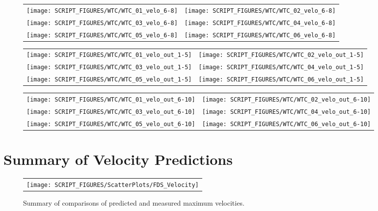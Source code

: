 \begin{figure}[p]
\begin{tabular*}{\textwidth}{l@{\extracolsep{\fill}}r}
\texttt{[image: SCRIPT\_FIGURES/WTC/WTC\_01\_velo\_6-8]} &
\texttt{[image: SCRIPT\_FIGURES/WTC/WTC\_02\_velo\_6-8]} \\
\texttt{[image: SCRIPT\_FIGURES/WTC/WTC\_03\_velo\_6-8]} &
\texttt{[image: SCRIPT\_FIGURES/WTC/WTC\_04\_velo\_6-8]} \\
\texttt{[image: SCRIPT\_FIGURES/WTC/WTC\_05\_velo\_6-8]} &
\texttt{[image: SCRIPT\_FIGURES/WTC/WTC\_06\_velo\_6-8]}
\end{tabular*}
\label{WTC_velo_6-8}
\end{figure}

\begin{figure}[p]
\begin{tabular*}{\textwidth}{l@{\extracolsep{\fill}}r}
\texttt{[image: SCRIPT\_FIGURES/WTC/WTC\_01\_velo\_out\_1-5]} &
\texttt{[image: SCRIPT\_FIGURES/WTC/WTC\_02\_velo\_out\_1-5]} \\
\texttt{[image: SCRIPT\_FIGURES/WTC/WTC\_03\_velo\_out\_1-5]} &
\texttt{[image: SCRIPT\_FIGURES/WTC/WTC\_04\_velo\_out\_1-5]} \\
\texttt{[image: SCRIPT\_FIGURES/WTC/WTC\_05\_velo\_out\_1-5]} &
\texttt{[image: SCRIPT\_FIGURES/WTC/WTC\_06\_velo\_out\_1-5]}
\end{tabular*}
\label{WTC_velo_out_1-5}
\end{figure}

\begin{figure}[p]
\begin{tabular*}{\textwidth}{l@{\extracolsep{\fill}}r}
\texttt{[image: SCRIPT\_FIGURES/WTC/WTC\_01\_velo\_out\_6-10]} &
\texttt{[image: SCRIPT\_FIGURES/WTC/WTC\_02\_velo\_out\_6-10]} \\
\texttt{[image: SCRIPT\_FIGURES/WTC/WTC\_03\_velo\_out\_6-10]} &
\texttt{[image: SCRIPT\_FIGURES/WTC/WTC\_04\_velo\_out\_6-10]} \\
\texttt{[image: SCRIPT\_FIGURES/WTC/WTC\_05\_velo\_out\_6-10]} &
\texttt{[image: SCRIPT\_FIGURES/WTC/WTC\_06\_velo\_out\_6-10]}
\end{tabular*}
\label{WTC_velo_out_6-10}
\end{figure}



\clearpage

\section{Summary of Velocity Predictions}
\label{Velocity}

\begin{figure}[h!]
\begin{center}
\begin{tabular}{l}
\texttt{[image: SCRIPT\_FIGURES/ScatterPlots/FDS\_Velocity]}
\end{tabular}
\end{center}
\caption[Summary of velocity predictions]
{Summary of comparisons of predicted and measured maximum velocities.}
\label{Steckler_Scatterplot}
\end{figure}


